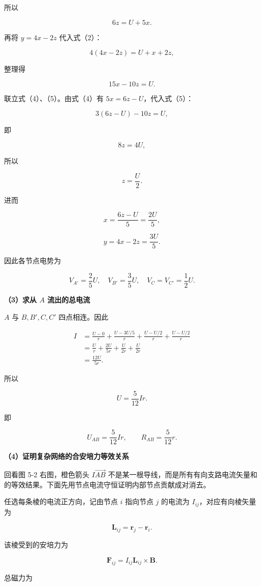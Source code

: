 \documentclass[12pt,a4paper,UTF8]{ctexart}
\begin{document}
所以

\[
6z=U+5x.
\tag{4}
\]

再将 \(y=4x-2z\) 代入式（2）：

\[
4(4x-2z)=U+x+2z,
\]

整理得

\[
15x-10z=U.
\tag{5}
\]

联立式（4）、（5）。由式（4）有 \(5x=6z-U\)，代入式（5）：

\[
3(6z-U)-10z=U,
\]

即

\[
8z=4U,
\]

所以

\[
z=\frac U2.
\]

进而

\[
x=\frac{6z-U}{5}=\frac{2U}{5},
\]

\[
y=4x-2z=\frac{3U}{5}.
\tag{6}
\]

因此各节点电势为

\[
V_{A'}=\frac25U,
\quad
V_{B'}=\frac35U,
\quad
V_C=V_{C'}=\frac12U.
\]

\textbf{（3）求从 \(A\) 流出的总电流}

\(A\) 与 \(B,B',C,C'\) 四点相连。因此

\[
\begin{aligned}
I
&=\frac{U-0}{r}
+\frac{U-3U/5}{r}
+\frac{U-U/2}{r}
+\frac{U-U/2}{r}\\
&=\frac Ur+\frac{2U}{5r}+\frac{U}{2r}+\frac{U}{2r}\\
&=\frac{12U}{5r}.
\end{aligned}
\tag{7}
\]

所以

\[
U=\frac{5}{12}Ir.
\]

即

\[
\boxed{U_{AB}=\frac{5}{12}Ir},
\qquad
\boxed{R_{AB}=\frac{5}{12}r}.
\tag{8}
\]

\textbf{（4）证明复杂网络的合安培力等效关系}

回看图 5-2 右图，橙色箭头 \(I\overrightarrow{AB}\)
不是某一根导线，而是所有有向支路电流矢量和的等效结果。下面先用节点电流守恒证明内部节点贡献成对消去。

任选每条棱的电流正方向，记由节点 \(i\) 指向节点 \(j\) 的电流为
\(I_{ij}\)，对应有向棱矢量为

\[
\bm L_{ij}=\bm r_j-\bm r_i.
\]

该棱受到的安培力为

\[
\bm F_{ij}=I_{ij}\bm L_{ij}\times\bm B.
\]

总磁力为
\end{document}
